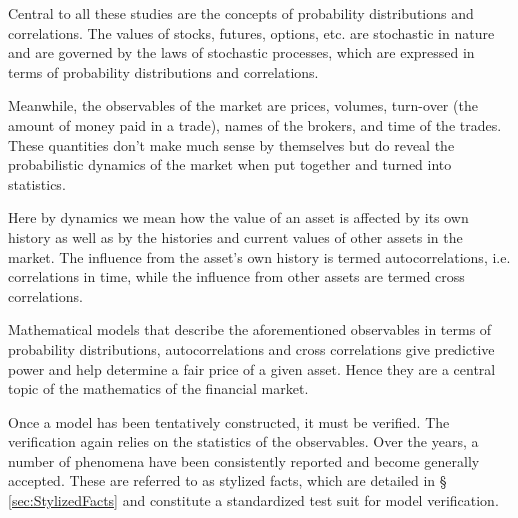 \documentclass{report}
\begin{document}
Central to all these studies are the concepts of probability
distributions and correlations. The values of stocks, futures,
options, etc. are stochastic in nature and are governed by the laws of
stochastic processes, which are expressed in terms of probability
distributions and correlations.

Meanwhile, the observables of the market are prices, volumes,
turn-over (the amount of money paid in a trade), names of the brokers,
and time of the trades. These quantities don't make much sense
by themselves but do reveal the probabilistic dynamics of the market
when put together and turned into statistics.

Here by dynamics we mean how the value of an asset is affected by its
own history as well as by the histories and current values of other
assets in the market. The influence from the asset's own history is
termed autocorrelations, i.e. correlations in time, while
the influence from other assets are termed cross correlations.

Mathematical models that describe the aforementioned observables in
terms of probability distributions, autocorrelations and cross
correlations give predictive power and help determine a fair price of
a given asset. Hence they are a central topic of the mathematics of
the financial market.

Once a model has been tentatively constructed, it must be
verified. The verification again relies on the statistics of the
observables. Over the years, a number of phenomena have been
consistently reported and become generally accepted. These are referred
to as stylized facts, which are detailed in \S
\ref{sec:StylizedFacts} and constitute a standardized test suit for
model verification.


\end{document}

